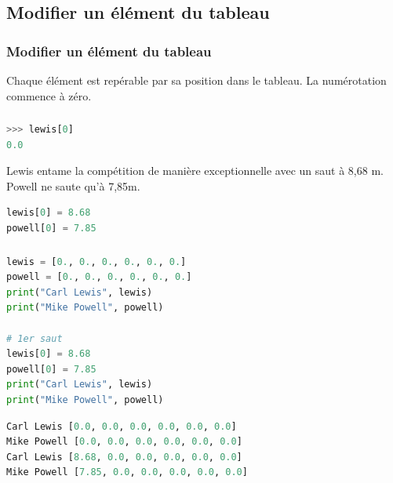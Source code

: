 \documentclass[svgnames,11pt]{beamer}
\begin{document}
\subsection{Modifier un élément du tableau}
\begin{frame}
    \frametitle{Modifier un élément du tableau}
    \begin{aretenir}[]
        Chaque élément est repérable par sa position dans le tableau. La numérotation commence à zéro.
    \end{aretenir}
    \begin{center}
    \end{center}

\end{frame}
\begin{frame}[fragile]
    \frametitle{}

    \begin{center}
        \begin{lstlisting}[language=Python , basicstyle=\ttfamily\small, xleftmargin=2em, xrightmargin=2em]
>>> lewis[0]
0.0
\end{lstlisting}
        \label{CODE}
    \end{center}
    Lewis entame la compétition de manière exceptionnelle avec un saut à 8,68 m. Powell ne saute qu'à 7,85m.
    \begin{center}
        \begin{lstlisting}[language=Python , basicstyle=\ttfamily\small, xleftmargin=2em, xrightmargin=2em]
lewis[0] = 8.68
powell[0] = 7.85
\end{lstlisting}
        \label{CODE}
    \end{center}
\end{frame}
\begin{frame}[fragile]
    \frametitle{}

    \begin{lstlisting}[language=Python , basicstyle=\ttfamily\small, xleftmargin=2em, xrightmargin=2em]
lewis = [0., 0., 0., 0., 0., 0.]
powell = [0., 0., 0., 0., 0., 0.]
print("Carl Lewis", lewis)
print("Mike Powell", powell)

# 1er saut
lewis[0] = 8.68
powell[0] = 7.85
print("Carl Lewis", lewis)
print("Mike Powell", powell)
\end{lstlisting}
    \begin{center}
        \begin{lstlisting}[language=Python , basicstyle=\ttfamily\small, xleftmargin=2em, xrightmargin=2em]
Carl Lewis [0.0, 0.0, 0.0, 0.0, 0.0, 0.0]
Mike Powell [0.0, 0.0, 0.0, 0.0, 0.0, 0.0]
Carl Lewis [8.68, 0.0, 0.0, 0.0, 0.0, 0.0]
Mike Powell [7.85, 0.0, 0.0, 0.0, 0.0, 0.0]
\end{lstlisting}
        \label{CODE}
    \end{center}
\end{frame}
\end{document}
